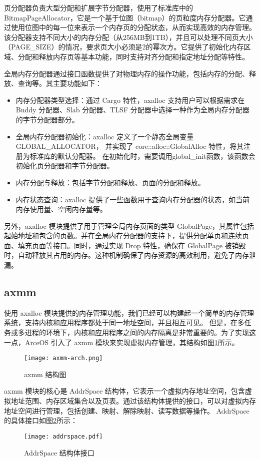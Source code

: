 页分配器负责大型分配和扩展字节分配器，使用了标准库中的 BitmapPageAllocator，它是一个基于位图（bitmap）的页粒度内存分配器。它通过使用位图中的每一位来表示一个内存页的分配状态，从而实现高效的内存管理。该分配器支持不同大小的内存分配（从256MB到1TB），并且可以处理不同页大小（PAGE\_SIZE）的情况，要求页大小必须是2的幂次方。它提供了初始化内存区域、分配和释放内存页等基本功能，同时支持对齐分配和指定地址分配等特性。

全局内存分配器通过接口函数提供了对物理内存的操作功能，包括内存的分配、释放、查询等。其主要功能如下：
\begin{itemize}
\item 内存分配器类型选择：通过 Cargo 特性，axalloc 支持用户可以根据需求在 Buddy 分配器、Slab 分配器、TLSF 分配器中选择一种作为全局内存分配器的字节分配器部分。
\item 全局内存分配器初始化：axalloc 定义了一个静态全局变量 GLOBAL\_ALLOCATOR，
并实现了 core::alloc::GlobalAlloc 特性，将其注册为标准库的默认分配器。
在初始化时，需要调用global\_init函数，该函数会初始化页分配器和字节分配器。
\item 内存分配与释放：包括字节分配和释放、页面的分配和释放。
\item 内存状态查询：axalloc 提供了一些函数用于查询内存分配器的状态，如当前内存使用量、空闲内存量等。
\end{itemize}

另外，axalloc 模块提供了用于管理全局内存页面的类型 GlobalPage，其属性包括起始地址和包含的页数。并在全局内存分配器的支持下，提供分配单页和连续页面、填充页面等接口。同时，通过实现 Drop 特性，确保在 GlobalPage 被销毁时，自动释放其占用的内存。这种机制确保了内存资源的高效利用，避免了内存泄漏。

\subsection{axmm}

使用 axalloc 模块提供的内存管理功能，我们已经可以构建起一个简单的内存管理系统，支持内核和应用程序都处于同一地址空间，并且相互可见。
但是，在多任务或多进程的环境下，内核和应用程序之间的内存隔离是非常重要的。为了实现这一点，ArceOS 引入了 axmm 模块来实现虚拟内存管理，其结构如图\ref{fig:axmm-arch}所示。

\begin{figure}
  \centering
  \texttt{[image: axmm-arch.png]}
  \caption{axmm 结构图}
  \label{fig:axmm-arch}
\end{figure}


axmm 模块的核心是 AddrSpace 结构体，它表示一个虚拟内存地址空间，包含虚拟地址范围、内存区域集合以及页表。通过该结构体提供的接口，可以对虚拟内存地址空间进行管理，包括创建、映射、解除映射、读写数据等操作。
AddrSpace 的具体接口如图\ref{fig:AddrSpace}所示：
\begin{figure}
    \centering
    \texttt{[image: addrspace.pdf]}
    \caption{AddrSpace 结构体接口}
    \label{fig:AddrSpace}
\end{figure}


